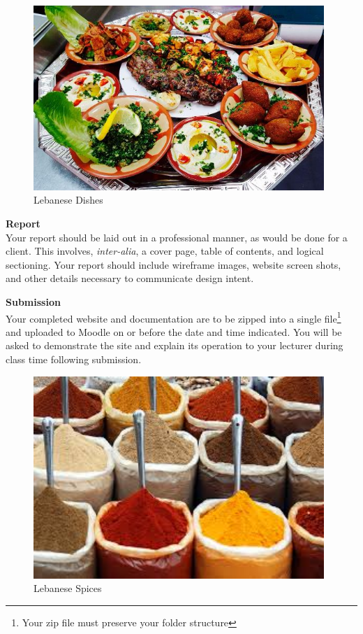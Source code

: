 \vspace{1cm}
\begin{figure}[h!t]
	\centering
	\includegraphics[width = 11cm]{img/lebFood1.jpg}
	\caption{Lebanese Dishes}
	\label{fig:nikonf3}
\end{figure}

\textbf{Report}\\
Your report should be laid out in a professional manner, as would be done for a client.  This involves, \emph{inter-alia}, a cover page, table of contents, and logical sectioning.  Your report should include wireframe images, website screen shots, and other details necessary to communicate design intent.
\vspace{1cm}

\textbf{Submission}\\
Your completed website and documentation are to be zipped into a single file\footnote{Your zip file must preserve your folder structure} and uploaded to Moodle on or before the date and time indicated.  You will be asked to demonstrate the site and explain its operation to your lecturer during class time following submission.




\vspace{1cm}
\begin{figure}[h!t]
	\centering
	\includegraphics[width = 11cm]{img/lebFood2.jpg}
	\caption{Lebanese Spices}
	\label{fig:reverso}
\end{figure}



